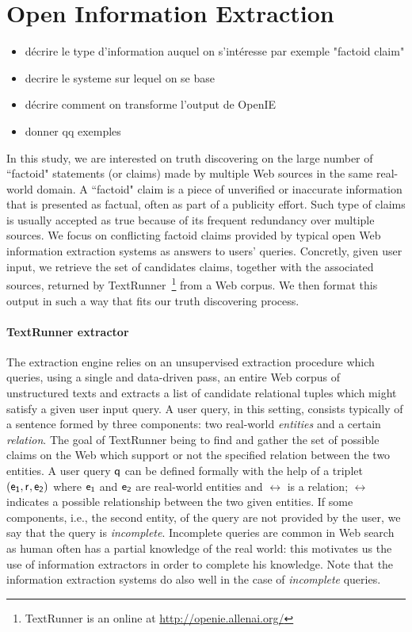 \section{Open Information Extraction}
\begin{itemize}
 \item décrire le type d'information auquel on s'intéresse par exemple "factoid claim"
 \item decrire le systeme sur lequel on se base
 \item décrire comment on transforme l'output de OpenIE
 \item donner qq exemples
\end{itemize}


In this study, we are interested on truth discovering on the large number of ``factoid" statements
(or claims) made by multiple Web sources in the same real-world domain. A ``factoid" claim is
a piece of unverified or inaccurate information that is presented as factual, often
as part of a publicity effort. Such type of claims  is usually accepted as true  because of its
frequent redundancy over multiple sources. We focus on conflicting factoid claims provided by typical 
open Web information extraction systems as answers to users' queries. Concretly, given user input, 
we retrieve the set of candidates claims, together with the associated sources, returned by TextRunner~\footnote{TextRunner is an online
at \href{http://openie.allenai.org/}{http://openie.allenai.org/}}
from a Web corpus. We then format this output in such a way that fits our truth discovering process.



\paragraph*{TextRunner extractor}
The extraction engine relies on an unsupervised extraction procedure which queries, using a single and data-driven 
pass, an entire Web corpus of unstructured texts and extracts a list of candidate relational tuples which might
satisfy a given user input query. A user query, in this setting, consists typically of a sentence formed by three
components: two real-world \emph{entities} and a certain \emph{relation}. The goal of TextRunner being to find and
gather the set of possible claims on the Web which support or not the specified relation between the two entities. 
A user query $\mathsf{q}$ can be defined formally with the help of a triplet $(\mathsf{e_{1}}, \mathsf{r}_{}, \mathsf{e_{2}})$ where $\mathsf{e_{1}}$ and $\mathsf{e_{2}}$ 
are real-world entities and $\rel{}$ is a relation; $\rel{}$ indicates a possible relationship between the
two given entities. If some components, i.e., the second entity, of the query are not provided by the user, we 
say that the query is \emph{incomplete}. Incomplete queries are common in Web search as human often has a partial
knowledge of the real world: this motivates us the use of information extractors in order to complete his knowledge.
Note that the information extraction systems do also well in the case of \emph{incomplete} queries.

